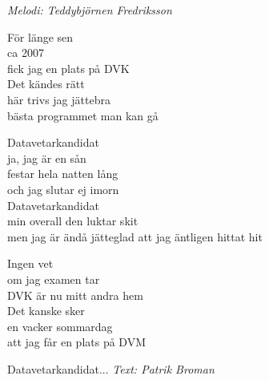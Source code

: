 {\footnotesize\textit{Melodi: Teddybjörnen Fredriksson}}\par
\vspace{10pt}
För länge sen\\
ca 2007\\
fick jag en plats på DVK\\
Det kändes rätt\\
här trivs jag jättebra\\
bästa programmet man kan gå\par
\vspace{10pt}
Datavetarkandidat\\
ja, jag är en sån\\
festar hela natten lång\\
och jag slutar ej imorn\\
Datavetarkandidat\\
min overall den luktar skit\\
men jag är ändå jätteglad att jag äntligen hittat hit\par
\vspace{10pt}
Ingen vet\\
om jag examen tar\\
DVK är nu mitt andra hem\\
Det kanske sker\\
en vacker sommardag\\
att jag får en plats på DVM\par
\vspace{10pt}
Datavetarkandidat...
\vspace{10pt}
{\footnotesize\textit{Text: Patrik Broman}}
